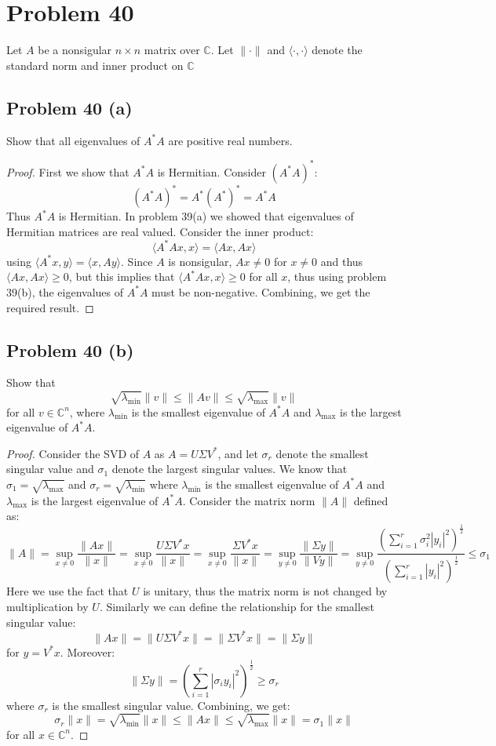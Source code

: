 \documentclass{article}[10pt]
\def\CC{\mathbb C}
\begin{document}
\section{Problem 40}
Let $A$ be a nonsigular $n\times n$ matrix over $\CC$. Let $\|\cdot\|$ and
$\langle \cdot,\cdot \rangle$ denote the standard norm and inner product on 
$\CC$
\subsection{Problem 40 (a)}
Show that all eigenvalues of $A^*A$ are positive real numbers.
\begin{proof}
First we show that $A^*A$ is Hermitian. Consider $(A^*A)^*$:
\[
(A^*A)^* = A^*(A^*)^* = A^*A
\]
Thus $A^*A$ is Hermitian. In problem 39(a) we showed that eigenvalues
of Hermitian matrices are real valued. Consider the inner product:
\[
\langle A^*Ax,x \rangle = \langle Ax,Ax \rangle
\] 
using $\langle A^*x,y \rangle = \langle x,Ay\rangle$. 
Since $A$ is nonsigular, $Ax \ne 0$ for $x\ne 0$ and thus $\langle Ax,Ax \rangle \ge 0$, but this implies that $\langle A^*Ax,x \rangle \ge 0$ for all $x$, 
thus using
problem 39(b), the eigenvalues of $A^*A$ must be non-negative. Combining, we
get the required result.
\end{proof}
\subsection{Problem 40 (b)}
Show that
\[
\sqrt{\lambda_{\min}}\|v\| \le \|Av\| \le \sqrt{\lambda_{\max}}\|v\|
\]
for all $v\in \CC^n$, where $\lambda_{\min}$ is the smallest
eigenvalue of $A^*A$ and $\lambda_{\max}$ is the largest eigenvalue
of $A^*A$.
\begin{proof}
Consider the SVD of $A$ as $A=U\Sigma V^*$, and let $\sigma_r$ denote the
smallest singular value and $\sigma_1$ denote the largest singular values.
We know that $\sigma_1=\sqrt{\lambda_{\max}}$ and $\sigma_r=\sqrt{\lambda_{\min}}$
where $\lambda_{\min}$ is the smallest
eigenvalue of $A^*A$ and $\lambda_{\max}$ is the largest eigenvalue
of $A^*A$.
Consider the matrix norm $\|A\|$ defined as:
\[
\|A\| = \sup_{x\ne 0} \frac{ \|Ax\|}{\|x\|} = \sup_{x\ne 0} \frac{ U\Sigma V^*x}{\|x\|} = \sup_{x\ne 0} \frac{ \Sigma V^*x}{\|x\|} = \sup_{y\ne 0} \frac{ \|\Sigma y\|}{\|Vy\|} = \sup_{y\ne 0} \frac{\left(\sum_{i=1}^r \sigma_i^2|y_i|^2\right)^{\frac{1}{2}}}{\left(\sum_{i=1}^r |y_i|^2\right)^\frac{1}{2}} \le \sigma_1
\]
Here we use the fact that $U$ is unitary, thus the matrix norm is not
changed by multiplication by $U$. Similarly we can define the relationship for
the smallest singular value:
\[
\|Ax\| = \|U\Sigma V^*x\| = \|\Sigma V^*x\| = \|\Sigma y\|
\]
for $y=V^*x$. Moreover:
\[
\|\Sigma y\| = \left( \sum_{i=1}^r|\sigma_i y_i|^2\right)^\frac{1}{2} \ge \sigma_r
\]
where $\sigma_r$ is the smallest singular value.
Combining, we get:
\[
\sigma_r\|x\| = \sqrt{\lambda_{\min}}\|x\| \le \|Ax\| \le \sqrt{\lambda_{\max}}\|x\| = \sigma_1\|x\|
\]
for all $x\in \CC^n$.
\end{proof}
\end{document}
